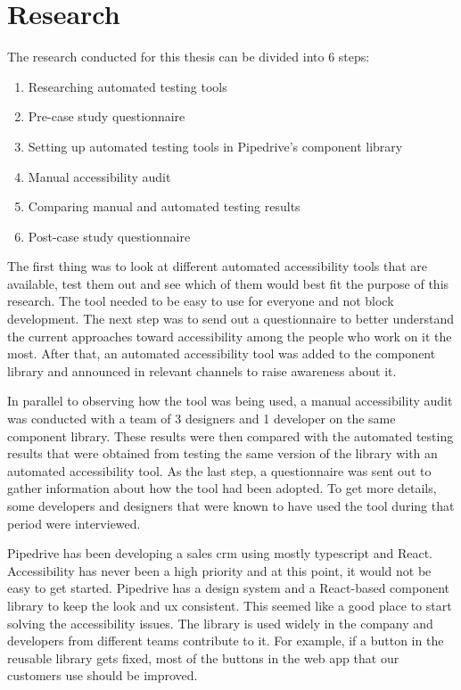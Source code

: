 \documentclass{master_thesis}
\begin{document}
\section{Research} \label{chap:research}

The research conducted for this thesis can be divided into 6 steps:

\begin{enumerate}
	\item Researching automated testing tools
	\item Pre-case study questionnaire
	\item Setting up automated testing tools in Pipedrive's component library
	\item Manual accessibility audit
	\item Comparing manual and automated testing results
	\item Post-case study questionnaire
\end{enumerate}

The first thing was to look at different automated accessibility tools that are available, test them out and see which of them would best fit the purpose of this research. The tool needed to be easy to use for everyone and not block development. The next step was to send out a questionnaire to better understand the current approaches toward accessibility among the people who work on it the most. After that, an automated accessibility tool was added to the component library and announced in relevant channels to raise awareness about it.

In parallel to observing how the tool was being used, a manual accessibility audit was conducted with a team of 3 designers and 1 developer on the same component library. These results were then compared with the automated testing results that were obtained from testing the same version of the library with an automated accessibility tool. As the last step, a questionnaire was sent out to gather information about how the tool had been adopted. To get more details, some developers and designers that were known to have used the tool during that period were interviewed.

Pipedrive has been developing a sales \ac{crm} using mostly typescript and React. Accessibility has never been a high priority and at this point, it would not be easy to get started. Pipedrive has a design system and a React-based component library to keep the look and \ac{ux} consistent. This seemed like a good place to start solving the accessibility issues. The library is used widely in the company and developers from different teams contribute to it. For example, if a button in the reusable library gets fixed, most of the buttons in the web app that our customers use should be improved.
\end{document}
